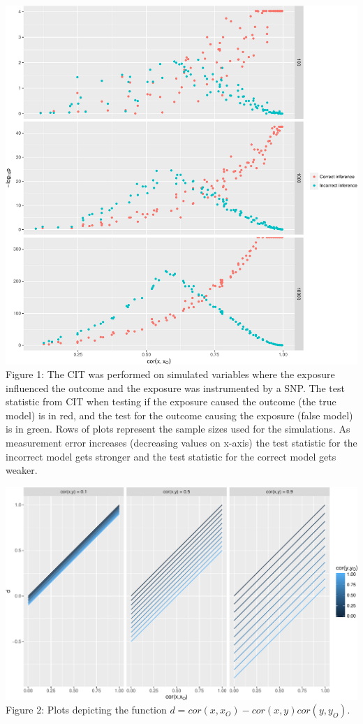 \documentclass[]{article}
\begin{document}
\includegraphics{manuscript_files/figure-latex/cit_measurement_error_figure-1.pdf}\\
Figure 1: The CIT was performed on simulated variables where the
exposure influenced the outcome and the exposure was instrumented by a
SNP. The test statistic from CIT when testing if the exposure caused the
outcome (the true model) is in red, and the test for the outcome causing
the exposure (false model) is in green. Rows of plots represent the
sample sizes used for the simulations. As measurement error increases
(decreasing values on x-axis) the test statistic for the incorrect model
gets stronger and the test statistic for the correct model gets weaker.

\newpage

\includegraphics{manuscript_files/figure-latex/d_relationship_figure-1.pdf}\\
Figure 2: Plots depicting the function
\(d = cor(x, x_O) - cor(x,y)cor(y, y_O)\).
\end{document}
